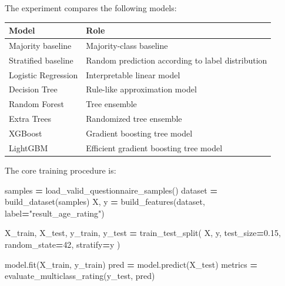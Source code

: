 \documentclass[UTF8,a4paper,12pt]{ctexart}
\newenvironment{Shaded}{\begin{snugshade}}{\end{snugshade}}
\newcommand{\DecValTok}[1]{\textcolor[rgb]{0.00,0.00,0.81}{#1}}
\newcommand{\FloatTok}[1]{\textcolor[rgb]{0.00,0.00,0.81}{#1}}
\newcommand{\NormalTok}[1]{#1}
\newcommand{\OperatorTok}[1]{\textcolor[rgb]{0.81,0.36,0.00}{\textbf{#1}}}
\newcommand{\StringTok}[1]{\textcolor[rgb]{0.31,0.60,0.02}{#1}}
\renewenvironment{Shaded}{%
    \vspace{0.35em}%
    \begin{tcolorbox}[enhanced,breakable,colback=zjucodebg,colframe=zjucodeframe,boxrule=0.45pt,leftrule=2.2pt,arc=1.6mm,left=1.8mm,right=1.8mm,top=1.2mm,bottom=1.2mm]%
  }{%
    \end{tcolorbox}%
    \vspace{0.25em}%
  }%
\newcounter{none}
\begin{document}
The experiment compares the following models:

{\def\LTcaptype{none} %
\begin{longtable}[]{@{}
  >{\raggedright\arraybackslash}p{}
  >{\raggedright\arraybackslash}p{}@{}}
\toprule\noalign{}
\begin{minipage}[b]{\linewidth}\raggedright
Model
\end{minipage} & \begin{minipage}[b]{\linewidth}\raggedright
Role
\end{minipage} \\
\midrule\noalign{}
\endhead
\bottomrule\noalign{}
\endlastfoot
Majority baseline & Majority-class baseline \\
Stratified baseline & Random prediction according to label distribution \\
Logistic Regression & Interpretable linear model \\
Decision Tree & Rule-like approximation model \\
Random Forest & Tree ensemble \\
Extra Trees & Randomized tree ensemble \\
XGBoost & Gradient boosting tree model \\
LightGBM & Efficient gradient boosting tree model \\
\end{longtable}
}

The core training procedure is:

\begin{Shaded}
\begin{Highlighting}[]
\NormalTok{samples }\OperatorTok{=}\NormalTok{ load\_valid\_questionnaire\_samples()}
\NormalTok{dataset }\OperatorTok{=}\NormalTok{ build\_dataset(samples)}
\NormalTok{X, y }\OperatorTok{=}\NormalTok{ build\_features(dataset, label}\OperatorTok{=}\StringTok{"result\_age\_rating"}\NormalTok{)}

\NormalTok{X\_train, X\_test, y\_train, y\_test }\OperatorTok{=}\NormalTok{ train\_test\_split(}
\NormalTok{    X, y, test\_size}\OperatorTok{=}\FloatTok{0.15}\NormalTok{, random\_state}\OperatorTok{=}\DecValTok{42}\NormalTok{, stratify}\OperatorTok{=}\NormalTok{y}
\NormalTok{)}

\NormalTok{model.fit(X\_train, y\_train)}
\NormalTok{pred }\OperatorTok{=}\NormalTok{ model.predict(X\_test)}
\NormalTok{metrics }\OperatorTok{=}\NormalTok{ evaluate\_multiclass\_rating(y\_test, pred)}
\end{Highlighting}
\end{Shaded}
\end{document}
